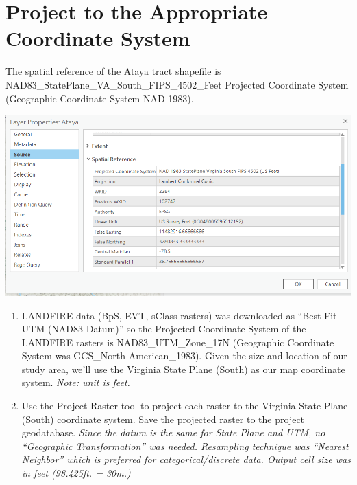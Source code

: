 \documentclass[
]{book}
\begin{document}
\hypertarget{project-to-the-appropriate-coordinate-system}{%
\section{Project to the Appropriate Coordinate System}\label{project-to-the-appropriate-coordinate-system}}

The spatial reference of the Ataya tract shapefile is NAD83\_StatePlane\_VA\_South\_FIPS\_4502\_Feet Projected Coordinate System (Geographic Coordinate System NAD 1983).

\includegraphics[width=1000pt]{04_gis_screenshots/4_crs_ataya}

\begin{enumerate}
\def\labelenumi{\arabic{enumi}.}
\item
  LANDFIRE data (BpS, EVT, sClass rasters) was downloaded as ``Best Fit UTM (NAD83 Datum)'' so the Projected Coordinate System of the LANDFIRE rasters is NAD83\_UTM\_Zone\_17N (Geographic Coordinate System was GCS\_North American\_1983).
  Given the size and location of our study area, we'll use the Virginia State Plane (South) as our map coordinate system. \emph{Note: unit is feet.}
\item
  Use the Project Raster tool to project each raster to the Virginia State Plane (South) coordinate system. Save the projected raster to the project geodatabase. \emph{Since the datum is the same for State Plane and UTM, no ``Geographic Transformation'' was needed. Resampling technique was ``Nearest Neighbor'' which is preferred for categorical/discrete data. Output cell size was in feet (98.425ft. = 30m.)}
\end{enumerate}
\end{document}
